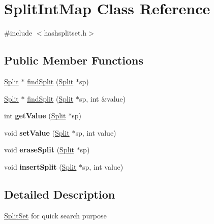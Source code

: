 \hypertarget{classSplitIntMap}{
\section{SplitIntMap Class Reference}
\label{classSplitIntMap}
}


{\ttfamily \#include $<$hashsplitset.h$>$}\subsection*{Public Member Functions}
\begin{DoxyCompactItemize}
\item 
\hyperlink{classSplit}{Split} $\ast$ \hyperlink{classSplitIntMap_ae86934b3eb2efeafda55f0e6a26bec09}{findSplit} (\hyperlink{classSplit}{Split} $\ast$sp)
\item 
\hyperlink{classSplit}{Split} $\ast$ \hyperlink{classSplitIntMap_abb18e331d550b889839b0f6427636512}{findSplit} (\hyperlink{classSplit}{Split} $\ast$sp, int \&value)
\item 
\hypertarget{classSplitIntMap_a922b1cf7f9415bea8a6d7b0b332cf7ab}{
int {\bfseries getValue} (\hyperlink{classSplit}{Split} $\ast$sp)}
\label{classSplitIntMap_a922b1cf7f9415bea8a6d7b0b332cf7ab}

\item 
\hypertarget{classSplitIntMap_a28c14844f8a7a6e381fe115ff49632db}{
void {\bfseries setValue} (\hyperlink{classSplit}{Split} $\ast$sp, int value)}
\label{classSplitIntMap_a28c14844f8a7a6e381fe115ff49632db}

\item 
\hypertarget{classSplitIntMap_aef719a7b617fc527072cc1579a3d6f2d}{
void {\bfseries eraseSplit} (\hyperlink{classSplit}{Split} $\ast$sp)}
\label{classSplitIntMap_aef719a7b617fc527072cc1579a3d6f2d}

\item 
\hypertarget{classSplitIntMap_acb0ff284023aa3b7dd3449a20f49c087}{
void {\bfseries insertSplit} (\hyperlink{classSplit}{Split} $\ast$sp, int value)}
\label{classSplitIntMap_acb0ff284023aa3b7dd3449a20f49c087}

\end{DoxyCompactItemize}


\subsection{Detailed Description}
\hyperlink{classSplitSet}{SplitSet} for quick search purpose

